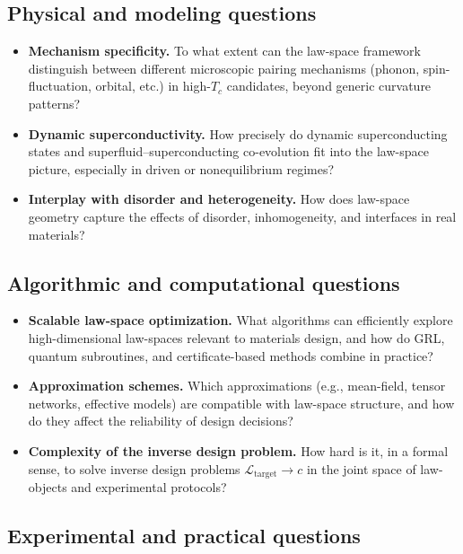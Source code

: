 \documentclass[11pt]{book}
\theoremstyle{plain}
\theoremstyle{definition}
\theoremstyle{remark}
\begin{document}
\subsection*{Physical and modeling questions}

\begin{itemize}
  \item \textbf{Mechanism specificity.}
        To what extent can the law-space framework distinguish
        between different microscopic pairing mechanisms (phonon,
        spin-fluctuation, orbital, etc.) in high-$T_c$ candidates,
        beyond generic curvature patterns?
  \item \textbf{Dynamic superconductivity.}
        How precisely do dynamic superconducting states and
        superfluid–superconducting co-evolution fit into the
        law-space picture, especially in driven or nonequilibrium
        regimes?
  \item \textbf{Interplay with disorder and heterogeneity.}
        How does law-space geometry capture the effects of disorder,
        inhomogeneity, and interfaces in real materials?
\end{itemize}

\subsection*{Algorithmic and computational questions}

\begin{itemize}
  \item \textbf{Scalable law-space optimization.}
        What algorithms can efficiently explore \\high-dimensional
        law-spaces relevant to materials design, and how do GRL,
        quantum subroutines, and certificate-based methods combine
        in practice?
  \item \textbf{Approximation schemes.}
        Which approximations (e.g., mean-field, tensor networks,
        effective models) are compatible with law-space structure,
        and how do they affect the reliability of design decisions?
  \item \textbf{Complexity of the inverse design problem.}
        How hard is it, in a formal sense, to solve inverse design
        problems $\mathcal{L}_{\mathrm{target}} \to c$ in the
        joint space of law-objects and experimental protocols?
\end{itemize}

\subsection*{Experimental and practical questions}
\end{document}
